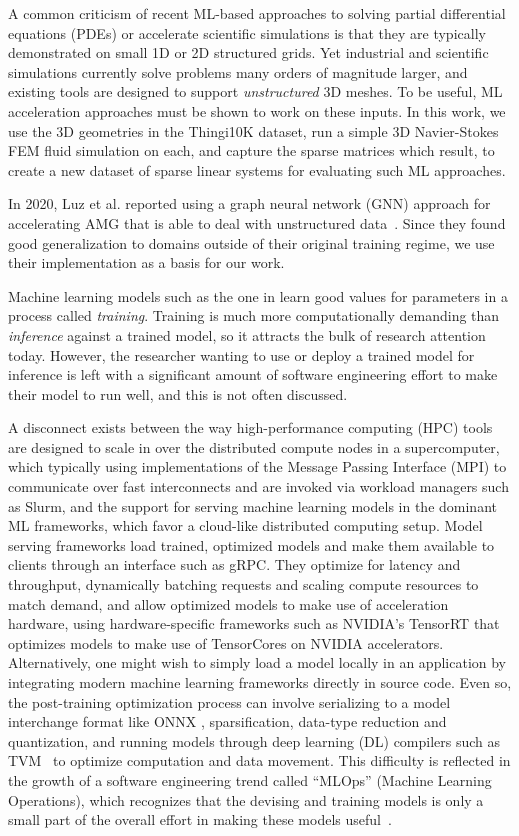 \documentclass{svproc}
\newcommand{\etal}{et al. }
\begin{document}
A common criticism of recent ML-based approaches to solving partial differential equations (PDEs) or accelerate scientific simulations is that they are typically demonstrated on small 1D or 2D structured grids. Yet industrial and scientific simulations currently solve problems many orders of magnitude larger, and existing tools are designed to support \textit{unstructured} 3D meshes. To be useful, ML acceleration approaches must be shown to work on these inputs. In this work, we use the 3D geometries in the Thingi10K dataset, run a simple 3D Navier-Stokes FEM fluid simulation on each, and capture the sparse matrices which result, to create a new dataset of sparse linear systems for evaluating such ML approaches.

In 2020, Luz \etal reported using a graph neural network (GNN) approach for accelerating AMG that is able to deal with unstructured data~\cite{Luz2020}. Since they found good generalization to domains outside of their original training regime, we use their implementation as a basis for our work.

Machine learning models such as the one in \cite{Luz2020} learn good values for parameters in a process called \textit{training}. Training is much more computationally demanding than \textit{inference} against a trained model, so it attracts the bulk of research attention today. However, the researcher wanting to use or deploy a trained model for inference is left with a significant amount of software engineering effort to make their model to run well, and this is not often discussed. 

A disconnect exists between the way high-performance computing (HPC) tools are designed to scale in over the distributed compute nodes in a supercomputer, which typically using implementations of the Message Passing Interface (MPI) to communicate over fast interconnects and are invoked via workload managers such as Slurm, and the support for serving machine learning models in the dominant ML frameworks, which favor a cloud-like distributed computing setup. Model serving frameworks load trained, optimized models and make them available to clients through an interface such as gRPC. They optimize for latency and throughput, dynamically batching requests and scaling compute resources to match demand, and allow optimized models to make use of acceleration hardware, using hardware-specific frameworks such as NVIDIA's TensorRT that optimizes models to make use of  TensorCores on NVIDIA accelerators. Alternatively, one might wish to simply load a model locally in an application by integrating modern machine learning frameworks directly in source code. Even so, the post-training optimization process can involve serializing to a model interchange format like ONNX \cite{onnx}, sparsification, data-type reduction and quantization, and running models through deep learning (DL) compilers such as TVM~\cite{TVM} to optimize computation and data movement. This difficulty is reflected in the growth of a software engineering trend called ``MLOps'' (Machine Learning Operations), which recognizes that the devising and training models is only a small part of the overall effort in making these models useful~\cite{paleyes2020challenges, konstantinos2020ml}.
\end{document}
